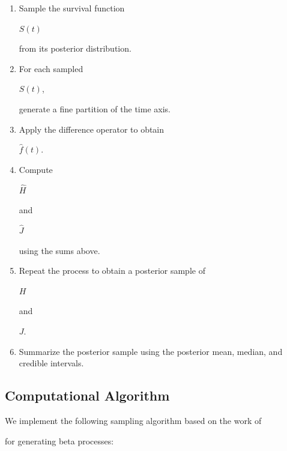 \documentclass[10pt,twoside]{article}
\numberwithin{equation}{section}
\begin{document}
\begin{enumerate}

\item

Sample the survival function 

$S(t)$ 

from its posterior distribution. 

\item

For each sampled 

$S(t)$, 

generate a fine partition of the time axis. 

\item

Apply the difference operator to obtain 

$\hat{f}(t)$. 

\item

Compute 

$\hat{H}$

and 

$\hat{J}$

using the sums above. 

\item

Repeat the process to obtain a posterior sample of 

$H$ 

and 

$J$. 

\item

Summarize the posterior sample using the posterior mean, median, and credible intervals. 

\end{enumerate}



\subsection{Computational Algorithm}

We implement the following sampling algorithm based on the work of

\citep{9} 

for generating beta processes: 
\end{document}
